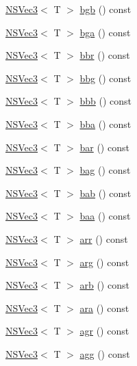 \begin{DoxyCompactItemize}
\item 
\hyperlink{structNSVec3}{N\-S\-Vec3}$<$ T $>$ \hyperlink{structNSVec4_a8ccec75df651b4682d1ed231fc0fd332}{bgb} () const 
\item 
\hyperlink{structNSVec3}{N\-S\-Vec3}$<$ T $>$ \hyperlink{structNSVec4_a4bc3c44abb099428bb45db23c8a27aa3}{bga} () const 
\item 
\hyperlink{structNSVec3}{N\-S\-Vec3}$<$ T $>$ \hyperlink{structNSVec4_ae9d61b987bdbd4bbd1250ca3b7b204e6}{bbr} () const 
\item 
\hyperlink{structNSVec3}{N\-S\-Vec3}$<$ T $>$ \hyperlink{structNSVec4_a3e87538ea59ed25bcb3257d307cd8080}{bbg} () const 
\item 
\hyperlink{structNSVec3}{N\-S\-Vec3}$<$ T $>$ \hyperlink{structNSVec4_a68b46d35411f7cd5c0dcfb94877f3d53}{bbb} () const 
\item 
\hyperlink{structNSVec3}{N\-S\-Vec3}$<$ T $>$ \hyperlink{structNSVec4_aa0bae42c42a15563d4f212a9088ee3f4}{bba} () const 
\item 
\hyperlink{structNSVec3}{N\-S\-Vec3}$<$ T $>$ \hyperlink{structNSVec4_a5963756dda10be620c936a2d27c485c2}{bar} () const 
\item 
\hyperlink{structNSVec3}{N\-S\-Vec3}$<$ T $>$ \hyperlink{structNSVec4_a5d70f4e7f3af622e8d6ffee1ebf01e3f}{bag} () const 
\item 
\hyperlink{structNSVec3}{N\-S\-Vec3}$<$ T $>$ \hyperlink{structNSVec4_aeba60b60c448e83315fe84b19eb15bae}{bab} () const 
\item 
\hyperlink{structNSVec3}{N\-S\-Vec3}$<$ T $>$ \hyperlink{structNSVec4_a452400565eb628d154728ae5a5e72928}{baa} () const 
\item 
\hyperlink{structNSVec3}{N\-S\-Vec3}$<$ T $>$ \hyperlink{structNSVec4_abc82c9d478542ba134f30fd0ee742da9}{arr} () const 
\item 
\hyperlink{structNSVec3}{N\-S\-Vec3}$<$ T $>$ \hyperlink{structNSVec4_ae0629a0ff02bb83eb7cf1d51fd4ad17f}{arg} () const 
\item 
\hyperlink{structNSVec3}{N\-S\-Vec3}$<$ T $>$ \hyperlink{structNSVec4_a0a2efc7d6df41d85da4f4e4fe6ab6aae}{arb} () const 
\item 
\hyperlink{structNSVec3}{N\-S\-Vec3}$<$ T $>$ \hyperlink{structNSVec4_a8ed71f07eb3c62e556272da725d2c956}{ara} () const 
\item 
\hyperlink{structNSVec3}{N\-S\-Vec3}$<$ T $>$ \hyperlink{structNSVec4_ab00aad40f69c71c8178bd61b8f509f9f}{agr} () const 
\item 
\hyperlink{structNSVec3}{N\-S\-Vec3}$<$ T $>$ \hyperlink{structNSVec4_af9a9eedcf24a96ba3d45a1f8e8903949}{agg} () const 

\end{DoxyCompactItemize}

